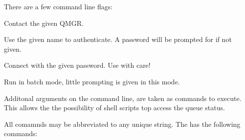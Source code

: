 There are a few command line flags:
\begin{describe}
\item[\verb|-Q name|:] Contact the given QMGR.
\item[\verb|-u user|:] Use the given name to authenticate. A password
will be prompted for if not given.
\item[\verb|-p passwd|:] Connect with the given password. Use with
care!
\item[\verb|-b|:] Run in batch mode, little prompting is given in this
mode. 
\end{describe}

Additonal arguments on the command line, are taken as commands to
execute.  This allows the the possibility of shell scripts top access
the queue status.

All comamnds may be abbreviated to any unique string. The
 has the following commands:
